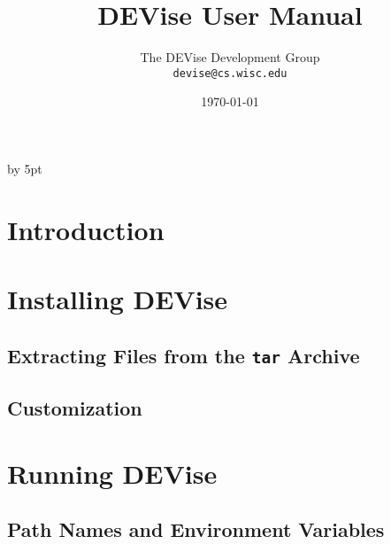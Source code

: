 
\renewcommand{\topfraction}{1.0}
\renewcommand{\bottomfraction}{1.0}
\renewcommand{\textfraction}{0.0}
\advance\intextsep by 5pt

\def\filename#1{{\tt #1}}
\def\code#1{{\tt #1}}
\def\menu#1{{\tt #1}}
\def\term#1{#1}
\def\variable#1{{\tt #1}}

\def\scaleepspic[#1]#2#3{
\begin{figure}[htb]
\centering\leavevmode\epsfxsize=#1\epsfbox{#2}
\caption{#3}
\end{figure}
}

\def\fullepspic#1#2{
\begin{figure}[htb]
\centering\leavevmode\epsfxsize=\textwidth\epsfbox{#1}
\caption{#2}
\end{figure}
}


\title{DEVise User Manual}
\author{The DEVise Development Group \\
\code{devise@cs.wisc.edu}
}
\date{\today}

\maketitle

\section{Introduction}

\section{Installing DEVise}

\subsection{Extracting Files from the \code{tar} Archive}

\subsection{Customization}

\section{Running DEVise}

\subsection{Path Names and Environment Variables}

